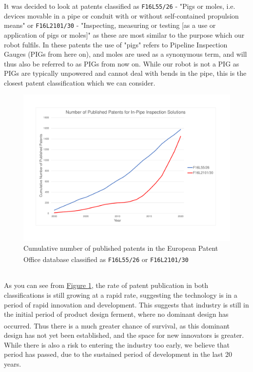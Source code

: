 \documentclass[11pt]{article}		%
\newlength{\imageheight}	 %
\begin{document}
	It was decided to look at patents classified as \verb|F16L55/26| - "Pigs or moles, i.e. devices movable in a pipe or conduit with or without self-contained propulsion means" or \verb|F16L2101/30| - "Inspecting, measuring or testing [as a use or application of pigs or moles]" as these are most similar to the purpose which our robot fulfils.
	In these patents the use of "pigs" refers to Pipeline Inspection Gauges (PIGs from here on), and moles are used as a synonymous term, and will thus also be referred to as PIGs from now on.
	While our robot is not a PIG as PIGs are typically unpowered and cannot deal with bends in the pipe, this is the closest patent classification which we can consider.
	\begin{figure}[h]
			\centering
			\includegraphics[height=\imageheight]{patentGraph}
			\caption{Cumulative number of published patents in the European Patent Office database classified as \texttt{F16L55/26}\textsuperscript{\cite{patent26}} or \texttt{F16L2101/30}\textsuperscript{\cite{patent30}} }
			\label{patentGraph}
	\end{figure}
	\\
	As you can see from \hyperref[patentGraph]{Figure \ref*{patentGraph}}, the rate of patent publication in both classifications is still growing at a rapid rate, suggesting the technology is in a period of rapid innovation and development.
	This suggests that industry is still in the initial period of product design ferment, where no dominant design has occurred\textsuperscript{\cite{christensen1998innovation}}.
	Thus there is a much greater chance of survival, as this dominant design has not yet been established, and the space for new innovators is greater.
	While there is also a risk to entering the industry too early, we believe that period has passed, due to the sustained period of development in the last 20 years.
	
\end{document}

